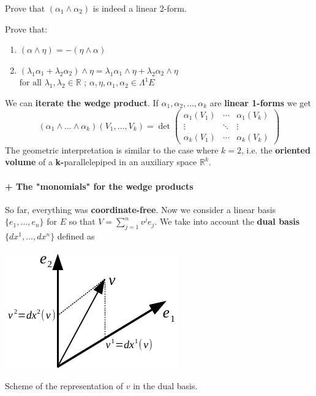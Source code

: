 \documentclass[../main.tex]{subfiles}
\begin{document}
\begin{example}
Prove that $(\alpha_1\wedge\alpha_2)$ is indeed a linear 2-form.
\end{example}
\begin{example}
Prove that:
\begin{enumerate}
    \item $(\alpha\wedge\eta)=-(\eta\wedge\alpha)$
    \item $(\lambda_1\alpha_1+\lambda_2\alpha_2)\wedge\eta=\lambda_1\alpha_1\wedge\eta+\lambda_2\alpha_2\wedge\eta$ \\
    $\text{for all } \lambda_1,\lambda_2\in\mathbb{R} \text{ ; } \alpha,\eta,\alpha_1,\alpha_2\in\Lambda^1 E$
\end{enumerate}
\end{example}
We can \textbf{iterate the wedge product}. If $\alpha_1,\alpha_2,\dots,\alpha_k$ are \textbf{linear 1-forms} we get
\[
(\alpha_1\wedge\dots\wedge\alpha_k)(V_1,\dots,V_k)=\det\begin{pmatrix}
\alpha_1(V_1) & \cdots & \alpha_1(V_k)\\
\vdots & \ddots & \vdots \\
\alpha_k(V_1) & \cdots & \alpha_k(V_k)
\end{pmatrix}
\]
The geometric interpretation is similar to the case where $\boxed{k=2}$, i.e. the \textbf{oriented volume} of a \textbf{k-}parallelepiped in an auxiliary space $\mathbb{R}^k$.
\paragraph{+ The "monomials" for the wedge products}
So far, everything was \textbf{coordinate-free}. Now we consider a linear basis $\{e_1,\dots,e_n\}$ for $E$ so that $V=\sum_{j=1}^{n}v^j e_j$. We take into account the \textbf{dual basis} $\{dx^1,\dots,dx^n\}$ defined as

\begin{marginfigure}[8mm]
	\includegraphics[width=1.1\linewidth]{images/dual_basis.pdf}
	\caption{Scheme of the representation of $v$ in the dual basis.}
\end{marginfigure}
\end{document}
